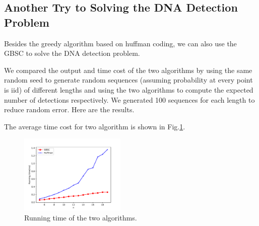 \subsection{Another Try to Solving the DNA Detection Problem}
Besides the greedy algorithm based on huffman coding, we can also use the GBSC to solve the DNA detection problem.

We compared the output and time cost of the two algorithms by using the same random seed to generate random sequences (assuming probability at every point is iid) of different lengths and using the two algorithms to compute the expected number of detections respectively. We generated 100 sequences for each length to reduce random error. Here are the results.

The average time cost for two algorithm is shown in Fig.\ref{fig:runningtime}.
\begin{figure}[H]
    \centering
    \includegraphics[width=0.45\textwidth]{figure/BHTime.pdf}
    \caption{Running time of the two algorithms.}
    \label{fig:runningtime}
\end{figure}

